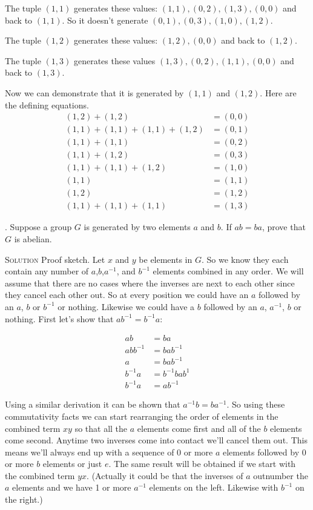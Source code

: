 \documentclass[twoside]{amsart}
\newcommand{\solution}{\textsc{Solution}\xspace}
\begin{document}
\begin{enumerate}[A.]
    The tuple $(1,1)$ generates these values: $(1,1), (0,2), (1,3), (0,0)$
    and back to 
    $(1,1)$. So it doesn't generate $(0,1), (0,3), (1,0), (1,2)$.

    The tuple $(1,2)$ generates these values: $(1,2), (0,0)$ and back to 
    $(1,2)$.

    The tuple $(1,3)$ generates these values $(1,3), (0,2), (1,1), (0,0)$
    and back to $(1,3)$. 

    Now we can demonstrate that it is generated by $(1,1)$ and $(1,2)$.
    Here are the defining equations.
    \begin{align*}
                        (1,2) + (1,2) &= (0,0) \\
        (1,1) + (1,1) + (1,1) + (1,2) &= (0,1) \\
                        (1,1) + (1,1) &= (0,2) \\
	                (1,1) + (1,2) &= (0,3) \\
	        (1,1) + (1,1) + (1,2) &= (1,0) \\
	                        (1,1) &= (1,1) \\
                                (1,2) &= (1,2) \\
                (1,1) + (1,1) + (1,1) &= (1,3) 
    \end{align*}

    . Suppose a group $G$ is generated by two elements
    $a$ and $b$. If $ab=ba$, prove that $G$ is abelian.
    
    \noindent \solution Proof sketch. Let $x$ and $y$ be elements
    in $G$. So we know they each contain any number of $a$,$b$,$a^{-1}$,
    and $b^{-1}$ elements combined in any order. We will assume
    that there are no cases where the inverses are next to each other
    since they cancel each other out. So at every position we could
    have an $a$ followed by
    an $a$, $b$ or $b^{-1}$ or nothing. 
    Likewise we could have a $b$ followed by an $a$, $a^{-1}$, $b$ or
    nothing. First let's show that $ab^{-1}=b^{-1}a$:

    \begin{align*}
              ab &= ba \\
	abb^{-1} &= bab^{-1} \\
	       a &= bab^{-1} \\
	 b^{-1}a &= b^{-1}bab^{1}\\
	 b^{-1}a &= ab^{-1}
    \end{align*}

    Using a similar derivation it can be shown that $a^{-1}b = ba^{-1}$. 
    So using these commutativity facts we can start rearranging the order
    of elements in the combined term $xy$ so that all the $a$ elements
    come first and all of the $b$ elements come second. Anytime two
    inverses come into contact we'll cancel them out. This means
    we'll always end up with a sequence of 0 or more $a$ elements
    followed by 0 or more $b$ elements or just $e$. The same result
    will be obtained if we start with the combined term $yx$. (Actually
    it could be that the inverses of $a$ outnumber the $a$ elements
    and we have 1 or more $a^{-1}$ elements on the left. Likewise
    with $b^{-1}$ on the right.)


\end{enumerate}
\end{document}
